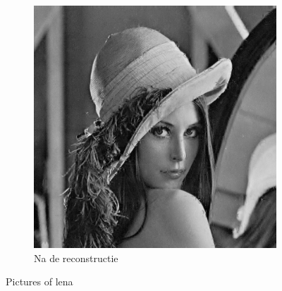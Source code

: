 \begin{figure}
\begin{subfigure}[b]{0.45\textwidth}
        \includegraphics[width=\textwidth]{../src/inpainting/lena_fixed}
        \caption{Na de reconstructie}
        \label{fig:mouse}
    \end{subfigure}
    \caption{Pictures of lena}\label{fig:animals}
\end{figure}




